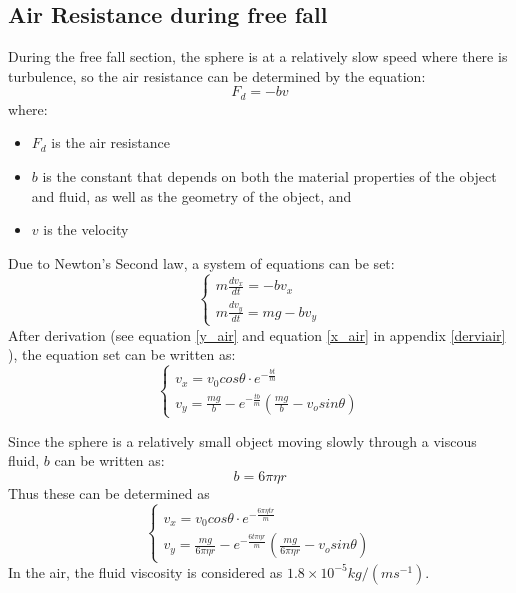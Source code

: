 \documentclass[conference]{IEEEtran}
\begin{document}
    
    \subsection{Air Resistance during free fall}
During the free fall section, the sphere is at a relatively slow speed where there is turbulence, so the air resistance can be determined by the equation:
\begin{equation}
    F_d = -bv
\end{equation}
where:
\begin{itemize}
    \item $F_d$ is the air resistance
    \item $b$ is the constant that depends on both the material properties of the object and fluid, as well as the geometry of the object, and
    \item $v$ is the velocity
\end{itemize}
Due to Newton's Second law, a system of equations can be set:
\begin{equation*}
    \begin{cases}
    m\frac{dv_x}{dt} = -bv_x\\
    m\frac{dv_y}{dt} = mg-bv_y
    \end{cases}
\end{equation*}
After derivation (see equation \ref{y_air} and equation \ref{x_air} in appendix \ref{derviair} ), the equation set can be written as:
\begin{equation*}
    \begin{cases}
    v_x = v_0cos\theta\cdot e^{-\frac{bt}{m}}\\
    v_y = \frac{mg}{b} - e^{-\frac{tb}{m}}(\frac{mg}{b}-v_osin\theta)
    \end{cases}
\end{equation*}

Since the sphere is a relatively small object moving slowly through a viscous fluid, $b$ can be written as:
\begin{equation}
    b = 6\pi\eta r
\end{equation}
Thus these can be determined as
\begin{equation*}
   \begin{cases}
       v_x = v_0 cos\theta\cdot e^{-\frac{6\pi\eta tr}{m}}\\
       v_y = \frac{mg}{6\pi\eta r} - e^{-\frac{6t\pi\eta r}{m}}(\frac{mg}{6\pi\eta r}-v_osin\theta)
   \end{cases} 
\end{equation*}
In the air, the fluid viscosity is considered as $1.8\times10^{-5}kg/(ms^{-1})$.
\end{document}
